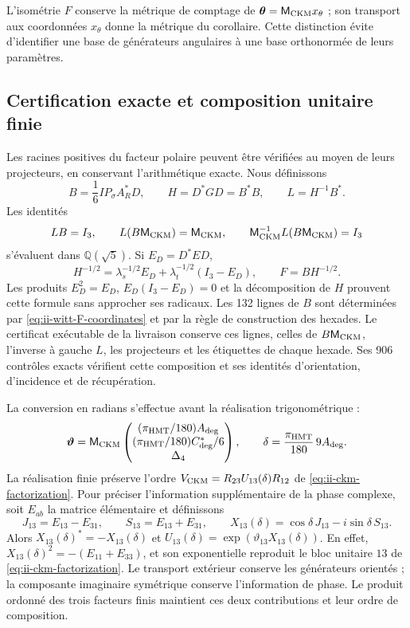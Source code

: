 L’isométrie \(F\) conserve la métrique de comptage de
\(\boldsymbol\theta=\mathsf M_{\rm CKM}x_\theta\) ; son transport
aux coordonnées \(x_\theta\) donne la métrique du corollaire. Cette
distinction évite d’identifier une base de générateurs angulaires à une
base orthonormée de leurs paramètres.

\subsection{Certification exacte et composition unitaire finie}

Les racines positives du facteur polaire peuvent être vérifiées au moyen de leurs
projecteurs, en conservant l’arithmétique exacte. Nous définissons
\begin{equation}
 B=\frac16IP_\sigma A_R^*D,\qquad
 H=D^*GD=B^*B,\qquad L=H^{-1}B^*.
 \label{eq:ii-witt-radical-free}
\end{equation}
Les identités
\[
 LB=I_3,\qquad L(B\mathsf M_{\rm CKM})=\mathsf M_{\rm CKM},\qquad
 \mathsf M_{\rm CKM}^{-1}L(B\mathsf M_{\rm CKM})=I_3
\]
s’évaluent dans \(\mathbb Q(\sqrt5)\). Si \(E_D=D^*ED\),
\[
 H^{-1/2}=\lambda_s^{-1/2}E_D+
          \lambda_t^{-1/2}(I_3-E_D),\qquad F=BH^{-1/2}.
\]
Les produits \(E_D^2=E_D\), \(E_D(I_3-E_D)=0\) et la
décomposition de \(H\) prouvent cette formule sans approcher ses
radicaux. Les 132 lignes de \(B\) sont déterminées par
\eqref{eq:ii-witt-F-coordinates} et par la règle de construction des
hexades. Le certificat exécutable de la livraison conserve ces lignes,
celles de \(B\mathsf M_{\rm CKM}\), l’inverse à gauche \(L\),
les projecteurs et les étiquettes de chaque hexade. Ses 906 contrôles
exacts vérifient cette composition et ses identités d’orientation,
d’incidence et de récupération.

La conversion en radians s’effectue avant la réalisation trigonométrique :
\begin{equation}
 \boldsymbol\vartheta=
 \mathsf M_{\rm CKM}
 \begin{pmatrix}(\pi_{\rm HMT}/180)A_{\rm deg}\\
 (\pi_{\rm HMT}/180)C^*_{\rm deg}/6\\\Delta_4\end{pmatrix},
 \qquad
 \delta=\frac{\pi_{\rm HMT}}{180}\,9A_{\rm deg}.
 \label{eq:ii-witt-angular-units}
\end{equation}
La réalisation finie préserve l’ordre
\(V_{\rm CKM}=R_{23}U_{13}(\delta)R_{12}\) de
\eqref{eq:ii-ckm-factorization}. Pour préciser l’information supplémentaire
de la phase complexe, soit \(E_{ab}\) la matrice élémentaire et définissons
\[
 J_{13}=E_{13}-E_{31},\qquad S_{13}=E_{13}+E_{31},\qquad
 X_{13}(\delta)=\cos\delta\,J_{13}-i\sin\delta\,S_{13}.
\]
Alors \(X_{13}(\delta)^*=-X_{13}(\delta)\) et
\(U_{13}(\delta)=\exp(\vartheta_{13}X_{13}(\delta))\).
En effet, \(X_{13}(\delta)^2=-(E_{11}+E_{33})\), et son exponentielle
reproduit le bloc unitaire \(13\) de
\eqref{eq:ii-ckm-factorization}. Le transport extérieur conserve les
générateurs orientés ; la composante imaginaire symétrique conserve
l’information de phase. Le produit ordonné des trois facteurs
finis maintient ces deux contributions et leur ordre de composition.

